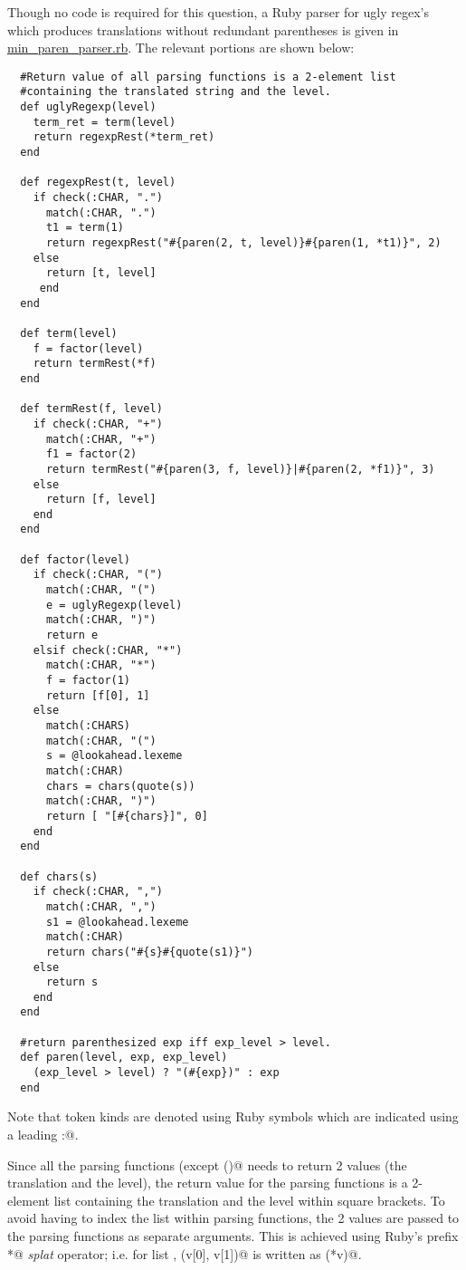 \documentclass[12pt]{article}
\begin{document}
\begin{enumerate}
\begin{itemize}
  \end{itemize}

  
Though no code is required for this question, a Ruby parser for ugly regex's which produces translations without redundant parentheses is given in \href{./min\_aren\_parser.rb}{min\_paren\_parser.rb}.  The relevant portions are shown below:
  

\begin{verbatim}
  #Return value of all parsing functions is a 2-element list
  #containing the translated string and the level.
  def uglyRegexp(level) 
    term_ret = term(level)
    return regexpRest(*term_ret)
  end

  def regexpRest(t, level)
    if check(:CHAR, ".") 
      match(:CHAR, ".")
      t1 = term(1)
      return regexpRest("#{paren(2, t, level)}#{paren(1, *t1)}", 2)
    else 
      return [t, level]
     end
  end

  def term(level)
    f = factor(level)
    return termRest(*f)
  end

  def termRest(f, level) 
    if check(:CHAR, "+")
      match(:CHAR, "+")
      f1 = factor(2)
      return termRest("#{paren(3, f, level)}|#{paren(2, *f1)}", 3)
    else 
      return [f, level]
    end
  end

  def factor(level)
    if check(:CHAR, "(") 
      match(:CHAR, "(")
      e = uglyRegexp(level)
      match(:CHAR, ")")
      return e
    elsif check(:CHAR, "*")
      match(:CHAR, "*")
      f = factor(1)
      return [f[0], 1]
    else 
      match(:CHARS)
      match(:CHAR, "(")
      s = @lookahead.lexeme
      match(:CHAR)
      chars = chars(quote(s))
      match(:CHAR, ")")
      return [ "[#{chars}]", 0]
    end
  end

  def chars(s) 
    if check(:CHAR, ",")
      match(:CHAR, ",")
      s1 = @lookahead.lexeme
      match(:CHAR)
      return chars("#{s}#{quote(s1)}")
    else 
      return s
    end
  end

  #return parenthesized exp iff exp_level > level.
  def paren(level, exp, exp_level)
    (exp_level > level) ? "(#{exp})" : exp
  end  
\end{verbatim}

Note that token kinds are denoted using Ruby symbols which are
indicated using a leading \verb@:@.

Since all the parsing functions (except \verb@chars()@ needs to return
2 values (the translation and the level), the return value for the
parsing functions is a 2-element list containing the translation and
the level within square brackets.  To avoid having to index the list
within parsing functions, the 2 values are passed to the parsing
functions as separate arguments.  This is achieved using Ruby's prefix
\verb@*@ \textit{splat} operator; i.e. for list \verb@v@,
\verb@fn(v[0], v[1])@ is written as \verb@fn(*v)@.
    


\end{enumerate}
\end{document}

